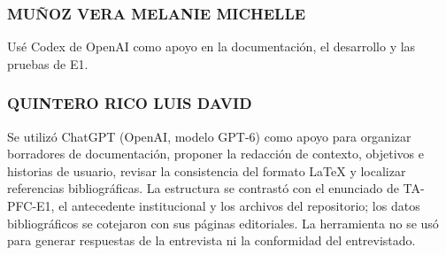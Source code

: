 \subsubsection*{MUÑOZ VERA MELANIE MICHELLE}
Usé Codex de OpenAI como apoyo en la documentación, el desarrollo y las pruebas de E1.

\subsubsection*{QUINTERO RICO LUIS DAVID}
Se utilizó ChatGPT (OpenAI, modelo GPT-6) como apoyo para organizar borradores de documentación, proponer la redacción de contexto, objetivos e historias de usuario, revisar la consistencia del formato LaTeX y localizar referencias bibliográficas. La estructura se contrastó con el enunciado de TA-PFC-E1, el antecedente institucional y los archivos del repositorio; los datos bibliográficos se cotejaron con sus páginas editoriales. La herramienta no se usó para generar respuestas de la entrevista ni la conformidad del entrevistado.

